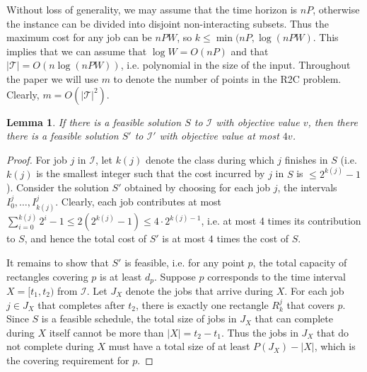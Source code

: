 \documentclass[11pt]{article}
\newtheorem{lemma}[thm]{Lemma}
\begin{document}
Without loss of generality, we may assume that the time horizon is $nP$,
otherwise the instance can be divided into disjoint non-interacting subsets.
Thus the maximum cost for any job can be $nPW$, so $k \leq \min(nP,\log(nPW)$. This implies that 
we can assume that $\log W = O(nP)$ and that  $|\mathcal{T}| = O(n \log (nPW) )$, 
i.e. polynomial in the size of the input. 
Throughout the paper we will use $m$ to denote the number of points in the R2C problem.
Clearly, $m = O(|\mathcal{T}|^2)$. 



\begin{lemma}
\label{gc:s}
If there is a feasible solution $S$ to $\mathcal I$ 
with objective value $v$, 
then there there is a feasible solution $S'$ to $\mathcal I'$
with objective value at most $4v$.
\end{lemma}
\begin{proof}
For job $j$ in $\mathcal I$, 
let $k(j)$ denote the class during which $j$ finishes in $S$
(i.e. $k(j)$ is the smallest integer such that the cost 
incurred by $j$ in $S$ is $\leq 2^{k(j)}-1$).
Consider the solution $S'$ obtained by choosing for each job $j$, 
the intervals $I^j_0, \ldots, I^j_{k(j)}$.
Clearly, each job contributes at most $\sum_{i=0}^{k(j)} 2^i-1 \leq 2(2^{k(j)}-1) \leq 4 \cdot 2^{k(j)-1}$,  i.e. at most 4 times its contribution to $S$, and hence the total cost of $S'$  
is at most $4$ times the cost of $S$.

It remains to show that  $S'$ is feasible, i.e. for any point $p$, the total capacity of rectangles covering $p$ is at least $d_p$. 
Suppose $p$ corresponds to the time interval $X= [t_1,t_2)$ from $\mathcal I$. 
Let $J_X$ denote the jobs that arrive during $X$. 
For  each job $j \in J_X$ that completes after $t_2$, 
there is exactly one rectangle $R^j_k$ that covers $p$. 
Since $S$ is a feasible schedule, the total size of jobs in $J_X$ 
that can complete during $X$ itself cannot be more than 
$|X|=t_2-t_1$. Thus the jobs in $J_X$ that do not complete during $X$ 
must have a total size of at least $P(J_X) - |X|$,
which is the covering requirement for $p$.
\end{proof}
\end{document}
